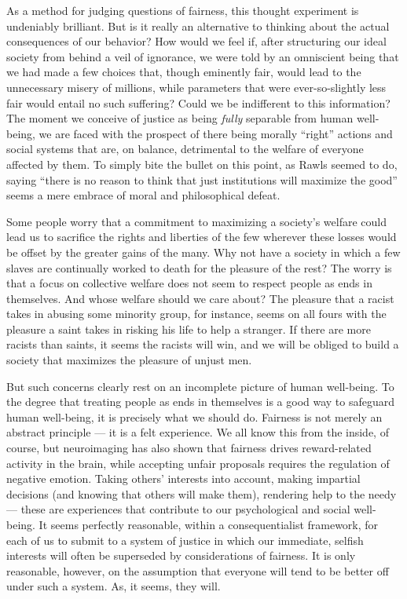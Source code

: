 \documentclass[a4paper,14pt]{extarticle}
\begin{document}
As a method for judging questions of fairness, this thought experiment is undeniably brilliant.
But is it really an alternative to thinking about the actual consequences of our behavior?
How would we feel if, after structuring our ideal society from behind a veil of ignorance, we were told by an omniscient being that we had made a few choices that, though eminently fair, would lead to the unnecessary misery of millions, while parameters that were ever-so-slightly less fair would entail no such suffering?
Could we be indifferent to this information?
The moment we conceive of justice as being \textit{fully} separable from human well-being, we are faced with the prospect of there being morally ``right'' actions and social systems that are, on balance, detrimental to the welfare of everyone affected by them.
To simply bite the bullet on this point, as Rawls seemed to do, saying ``there is no reason to think that just institutions will maximize the good'' seems a mere embrace of moral and philosophical defeat.

Some people worry that a commitment to maximizing a society's welfare could lead us to sacrifice the rights and liberties of the few wherever these losses would be offset by the greater gains of the many.
Why not have a society in which a few slaves are continually worked to death for the pleasure of the rest?
The worry is that a focus on collective welfare does not seem to respect people as ends in themselves.
And whose welfare should we care about?
The pleasure that a racist takes in abusing some minority group, for instance, seems on all fours with the pleasure a saint takes in risking his life to help a stranger.
If there are more racists than saints, it seems the racists will win, and we will be obliged to build a society that maximizes the pleasure of unjust men.

But such concerns clearly rest on an incomplete picture of human well-being.
To the degree that treating people as ends in themselves is a good way to safeguard human well-being, it is precisely what we should do.
Fairness is not merely an abstract principle --- it is a felt experience.
We all know this from the inside, of course, but neuroimaging has also shown that fairness drives reward-related activity in the brain, while accepting unfair proposals requires the regulation of negative emotion.
Taking others' interests into account, making impartial decisions (and knowing that others will make them), rendering help to the needy --- these are experiences that contribute to our psychological and social well-being.
It seems perfectly reasonable, within a consequentialist framework, for each of us to submit to a system of justice in which our immediate, selfish interests will often be superseded by considerations of fairness.
It is only reasonable, however, on the assumption that everyone will tend to be better off under such a system.
As, it seems, they will.
\end{document}
